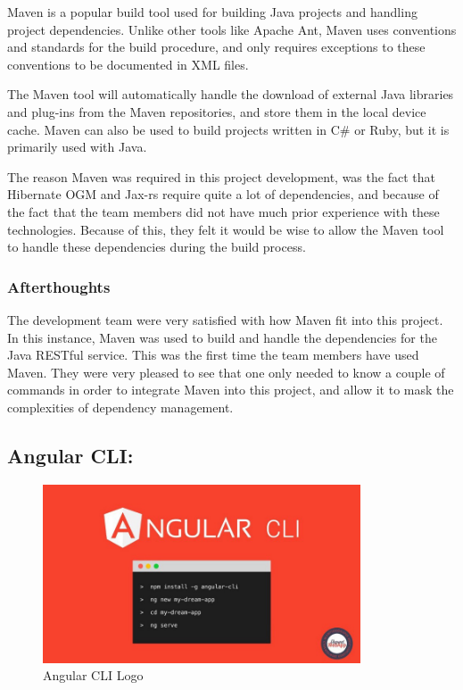 Maven is a popular build tool used for building Java projects and handling project dependencies. Unlike other tools like Apache Ant, Maven uses conventions and standards for the build procedure, and only requires exceptions to these conventions to be documented in XML files. 

The Maven tool will automatically handle the download of external Java libraries and plug-ins from the Maven repositories, and store them in the local device cache. Maven can also be used to build projects written in C\# or Ruby, but it is primarily used with Java. 

\bigskip

The reason Maven was required in this project development, was the fact that Hibernate OGM and Jax-rs require quite a lot of dependencies, and because of the fact that the team members did not have much prior experience with these technologies. Because of this, they felt it would be wise to allow the Maven tool to handle these dependencies during the build process.

\subsubsection{Afterthoughts}
The development team were very satisfied with how Maven fit into this project. In this instance, Maven was used to build and handle the dependencies for the Java RESTful service. This was the first time the team members have used Maven. They were very pleased to see that one only needed to know a couple of commands in order to integrate Maven into this project, and allow it to mask the complexities of dependency management.

\subsection{Angular CLI:}
\label{sec:TechnologyReviewCLI}

\begin{figure}[H]
    \centering
    \includegraphics[width=\textwidth, height=150pt]{img/AngularCliLogo.jpeg}
    \caption{Angular CLI Logo}
    \label{fig:my_label}
\end{figure}

